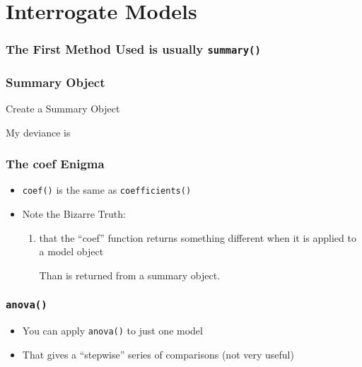 \documentclass[10pt,english]{beamer}
\begin{document}

\section{Interrogate Models}


\begin{frame}
  \frametitle{The First Method Used is usually \texttt{summary()}}



\end{frame}


\begin{frame}
  \frametitle{Summary Object}

  Create a Summary Object


 My deviance is



\end{frame}


\begin{frame}
  \frametitle{The coef Enigma}

  \begin{itemize}
  \item \texttt{coef()} is the same as \texttt{coefficients()}

  \item Note the Bizarre Truth:
    \begin{enumerate}
    \item that the ``coef'' function returns
something different when it is applied to a model object


Than is returned from a summary object.


\end{enumerate}
\end{itemize}
\end{frame}






\begin{frame}[containsverbatim]
  \frametitle{\texttt{anova()}}
  \begin{itemize}
    \item You can apply \texttt{anova()} to just one model
    \item That gives a ``stepwise'' series of comparisons (not very useful)


\end{itemize}
\end{frame}
\end{document}
